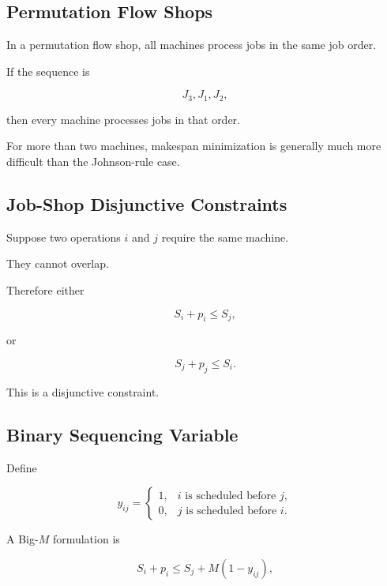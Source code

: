 \subsection{Permutation Flow Shops}
\label{subsec:permutation-flow-shops}

In a permutation flow shop, all machines process jobs in the same job
order.

If the sequence is

\[
J_3,J_1,J_2,
\]

then every machine processes jobs in that order.

For more than two machines, makespan minimization is generally much more
difficult than the Johnson-rule case.

\subsection{Job-Shop Disjunctive Constraints}
\label{subsec:job-shop-disjunctive}

Suppose two operations \(i\) and \(j\) require the same machine.

They cannot overlap.

Therefore either

\[
\boxed{
S_i+p_i
\leq
S_j,
}
\]

or

\[
\boxed{
S_j+p_j
\leq
S_i.
}
\]

This is a disjunctive constraint.

\subsection{Binary Sequencing Variable}
\label{subsec:binary-sequencing-variable}

Define

\[
y_{ij}
=
\begin{cases}
1,
&
i\text{ is scheduled before }j,
\\
0,
&
j\text{ is scheduled before }i.
\end{cases}
\]

A Big-\(M\) formulation is

\[
\boxed{
S_i+p_i
\leq
S_j
+
M(1-y_{ij}),
}
\]

